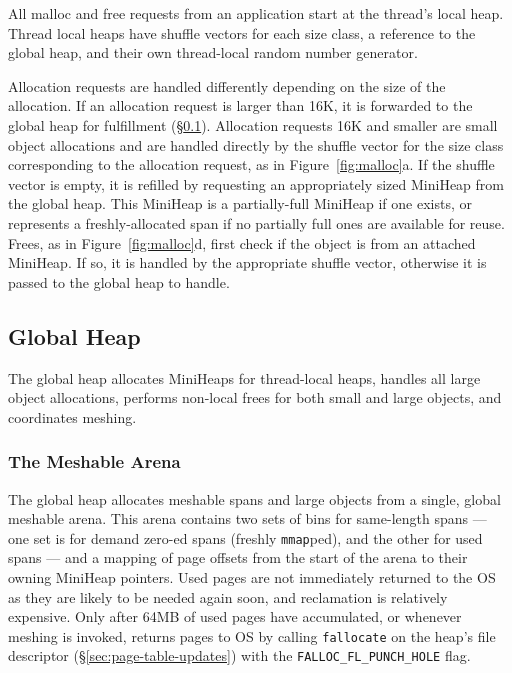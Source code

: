 All malloc and free requests from an application start at the thread's
local heap. Thread local heaps have shuffle vectors for each size
class, a reference to the global heap, and their own thread-local
random number generator.

Allocation requests are handled differently depending on the size of
the allocation.  If an allocation request is larger than 16K, it is
forwarded to the global heap for fulfillment
(\S\ref{sec:global-heap}).  Allocation requests 16K and smaller are
small object allocations and are handled directly by the shuffle
vector for the size class corresponding to the allocation request, as
in Figure~\ref{fig:malloc}a.  If the shuffle vector is empty, it is
refilled by requesting an appropriately sized MiniHeap from the global
heap.  This MiniHeap is a partially-full MiniHeap if one exists, or
represents a freshly-allocated span if no partially full ones are
available for reuse.  Frees, as in Figure~\ref{fig:malloc}d, first
check if the object is from an attached MiniHeap.  If so, it is
handled by the appropriate shuffle vector, otherwise it is passed to
the global heap to handle.

\subsection{Global Heap}
\label{sec:global-heap}

The global heap allocates MiniHeaps for thread-local heaps, handles
all large object allocations, performs non-local frees for both small
and large objects, and coordinates meshing.

\subsubsection{The Meshable Arena}
\label{sec:meshable-arena}

The global heap allocates meshable spans and large objects from a
single, global meshable arena. This arena contains two sets of bins
for same-length spans --- one set is for demand zero-ed spans (freshly
\texttt{mmap}ped), and the other for used spans --- and a mapping of
page offsets from the start of the arena to their owning MiniHeap
pointers.  Used pages are not immediately returned to the OS as they
are likely to be needed again soon, and reclamation is relatively
expensive. Only after 64MB of used pages have accumulated, or whenever
meshing is invoked, \Mesh{} returns pages to OS by calling
\texttt{fallocate} on the heap's file descriptor
(\S\ref{sec:page-table-updates}) with the
\texttt{FALLOC\_FL\_PUNCH\_HOLE} flag.

